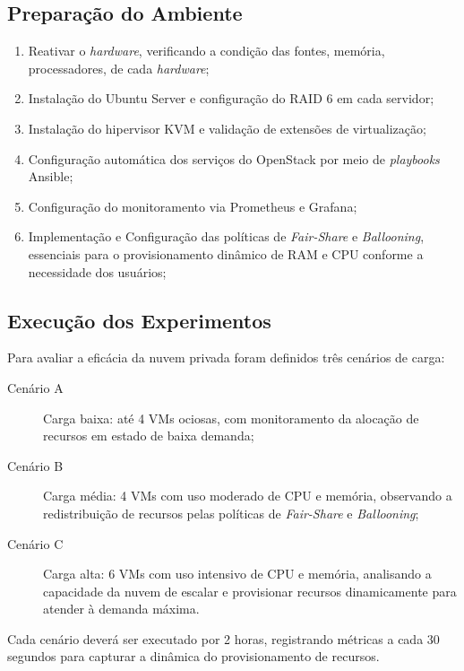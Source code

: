 \subsection{Preparação do Ambiente}
\begin{enumerate}
    \item Reativar o \textit{hardware}, verificando a condição das fontes, memória, processadores, de cada \textit{hardware};
    \item Instalação do Ubuntu Server e configuração do RAID 6 em cada servidor;
    \item Instalação do hipervisor KVM e validação de extensões de virtualização;
    \item Configuração automática dos serviços do OpenStack por meio de \textit{playbooks} Ansible;
    \item Configuração do monitoramento via Prometheus e Grafana;
    \item Implementação e Configuração das políticas de \textit{Fair-Share} e \textit{Ballooning}, essenciais para o provisionamento dinâmico de RAM e CPU conforme a necessidade dos usuários;
\end{enumerate}

\subsection{Execução dos Experimentos}
Para avaliar a eficácia da nuvem privada foram definidos três cenários de carga:
\begin{description}
    \item[Cenário A] Carga baixa: até 4 VMs ociosas, com monitoramento da alocação de recursos em estado de baixa demanda;
    \item[Cenário B] Carga média: 4 VMs com uso moderado de CPU e memória, observando a redistribuição de recursos pelas políticas de \textit{Fair-Share} e \textit{Ballooning};
    \item[Cenário C] Carga alta: 6 VMs com uso intensivo de CPU e memória, analisando a capacidade da nuvem de escalar e provisionar recursos dinamicamente para atender à demanda máxima.
\end{description}
Cada cenário deverá ser executado por 2 horas, registrando métricas a cada 30 segundos para capturar a dinâmica do provisionamento de recursos.

